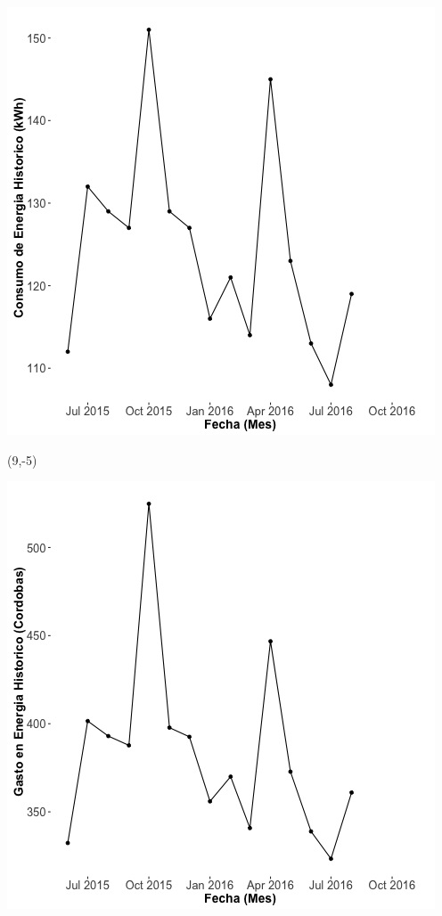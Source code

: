 \documentclass{article}\usepackage[]{graphicx}\usepackage[]{color}
\newenvironment{knitrout}{}{} %
\begin{document}
\begin{knitrout}
\color{fgcolor}
\includegraphics[scale=0.65]{figure/A22_historico_energia} 
\end{knitrout}

 \begin{textblock}{1}(9,-5)
\begin{minipage}{20em}
\begingroup

\endgroup
\end{minipage}
\end{textblock}

\begin{knitrout}
\color{fgcolor}
\includegraphics[scale=0.65]{figure/A22_historico_cordobas} 
\end{knitrout}
\end{document}
